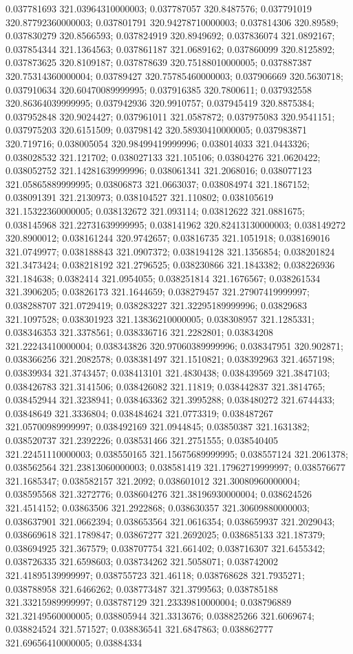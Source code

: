 0.037781693 321.03964310000003; 0.037787057 320.8487576; 0.037791019 320.87792360000003; 0.037801791 320.94278710000003; 0.037814306 320.89589; 0.037830279 320.8566593; 0.037824919 320.8949692; 0.037836074 321.0892167; 0.037854344 321.1364563; 0.037861187 321.0689162; 0.037860099 320.8125892; 0.037873625 320.8109187; 0.037878639 320.75188010000005; 0.037887387 320.75314360000004; 0.03789427 320.75785460000003; 0.037906669 320.5630718; 0.037910634 320.60470089999995; 0.037916385 320.7800611; 0.037932558 320.86364039999995; 0.037942936 320.9910757; 0.037945419 320.8875384; 0.037952848 320.9024427; 0.037961011 321.0587872; 0.037975083 320.9541151; 0.037975203 320.6151509; 0.03798142 320.58930410000005; 0.037983871 320.719716; 0.038005054 320.98499419999996; 0.038014033 321.0443326; 0.038028532 321.121702; 0.038027133 321.105106; 0.03804276 321.0620422; 0.038052752 321.14281639999996; 0.038061341 321.2068016; 0.038077123 321.05865889999995; 0.03806873 321.0663037; 0.038084974 321.1867152; 0.038091391 321.2130973; 0.038104527 321.110802; 0.038105619 321.15322360000005; 0.038132672 321.093114; 0.03812622 321.0881675; 0.038145968 321.22731639999995; 0.038141962 320.82413130000003; 0.038149272 320.8900012; 0.038161244 320.9742657; 0.03816735 321.1051918; 0.038169016 321.0749977; 0.038188843 321.0907372; 0.038194128 321.1356854; 0.038201824 321.3473424; 0.038218192 321.2796525; 0.038230866 321.1843382; 0.038226936 321.184638; 0.0382414 321.0954055; 0.038251814 321.1676567; 0.038261534 321.3906205; 0.03826173 321.1644659; 0.038279457 321.27907419999997; 0.038288707 321.0729419; 0.038283227 321.32295189999996; 0.03829683 321.1097528; 0.038301923 321.13836210000005; 0.038308957 321.1285331; 0.038346353 321.3378561; 0.038336716 321.2282801; 0.03834208 321.22243410000004; 0.038343826 320.97060389999996; 0.038347951 320.902871; 0.038366256 321.2082578; 0.038381497 321.1510821; 0.038392963 321.4657198; 0.03839934 321.3743457; 0.038413101 321.4830438; 0.038439569 321.3847103; 0.038426783 321.3141506; 0.038426082 321.11819; 0.038442837 321.3814765; 0.038452944 321.3238941; 0.038463362 321.3995288; 0.038480272 321.6744433; 0.03848649 321.3336804; 0.038484624 321.0773319; 0.038487267 321.05700989999997; 0.038492169 321.0944845; 0.03850387 321.1631382; 0.038520737 321.2392226; 0.038531466 321.2751555; 0.038540405 321.22451110000003; 0.038550165 321.15675689999995; 0.038557124 321.2061378; 0.038562564 321.23813060000003; 0.038581419 321.17962719999997; 0.038576677 321.1685347; 0.038582157 321.2092; 0.038601012 321.30080960000004; 0.038595568 321.3272776; 0.038604276 321.38196930000004; 0.038624526 321.4514152; 0.03863506 321.2922868; 0.038630357 321.30609880000003; 0.038637901 321.0662394; 0.038653564 321.0616354; 0.038659937 321.2029043; 0.038669618 321.1789847; 0.03867277 321.2692025; 0.038685133 321.187379; 0.038694925 321.367579; 0.038707754 321.661402; 0.038716307 321.6455342; 0.038726335 321.6598603; 0.038734262 321.5058071; 0.038742002 321.41895139999997; 0.038755723 321.46118; 0.038768628 321.7935271; 0.038788958 321.6466262; 0.038773487 321.3799563; 0.038785188 321.33215989999997; 0.038787129 321.23339810000004; 0.038796889 321.32149560000005; 0.038805944 321.3313676; 0.038825266 321.6069674; 0.038824524 321.571527; 0.038836541 321.6847863; 0.038862777 321.69656410000005; 0.03884334 